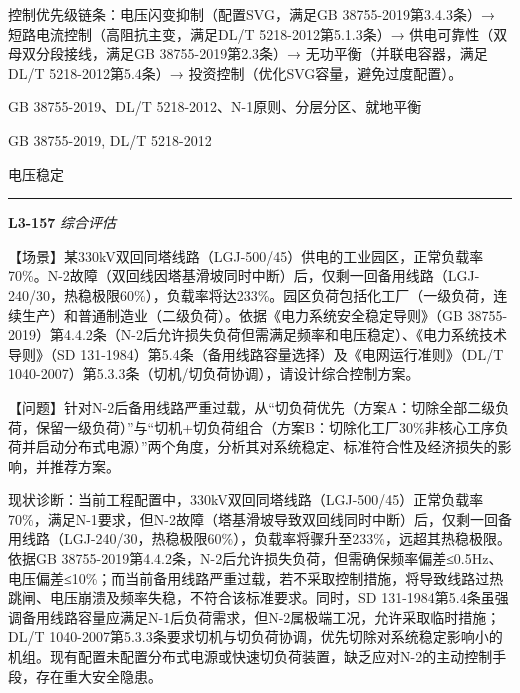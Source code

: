 \documentclass[12pt,a4paper]{ctexart}
\begin{document}
\begin{description}[leftmargin=1.5em,style=nextline,font=\normalfont]
控制优先级链条：电压闪变抑制（配置SVG，满足GB 38755-2019第3.4.3条）→ 短路电流控制（高阻抗主变，满足DL/T 5218-2012第5.1.3条）→ 供电可靠性（双母双分段接线，满足GB 38755-2019第2.3条）→ 无功平衡（并联电容器，满足DL/T 5218-2012第5.4条）→ 投资控制（优化SVG容量，避免过度配置）。
  \item[KW:] GB 38755-2019、DL/T 5218-2012、N-1原则、分层分区、就地平衡
  \item[Std:] GB 38755-2019, DL/T 5218-2012
  \item[Topic:] 电压稳定
\end{description}
\vspace{4pt}
\hrule\vspace{6pt}

\noindent\textbf{L3-157} \hfill \textit{综合评估}
\begin{description}[leftmargin=1.5em,style=nextline,font=\normalfont]
  \item[Q:] 【场景】某330kV双回同塔线路（LGJ-500/45）供电的工业园区，正常负载率70\%。N-2故障（双回线因塔基滑坡同时中断）后，仅剩一回备用线路（LGJ-240/30，热稳极限60\%），负载率将达233\%。园区负荷包括化工厂（一级负荷，连续生产）和普通制造业（二级负荷）。依据《电力系统安全稳定导则》（GB 38755-2019）第4.4.2条（N-2后允许损失负荷但需满足频率和电压稳定）、《电力系统技术导则》（SD 131-1984）第5.4条（备用线路容量选择）及《电网运行准则》（DL/T 1040-2007）第5.3.3条（切机/切负荷协调），请设计综合控制方案。

【问题】针对N-2后备用线路严重过载，从“切负荷优先（方案A：切除全部二级负荷，保留一级负荷）”与“切机+切负荷组合（方案B：切除化工厂30\%非核心工序负荷并启动分布式电源）”两个角度，分析其对系统稳定、标准符合性及经济损失的影响，并推荐方案。
  \item[A:] 现状诊断：当前工程配置中，330kV双回同塔线路（LGJ-500/45）正常负载率70\%，满足N-1要求，但N-2故障（塔基滑坡导致双回线同时中断）后，仅剩一回备用线路（LGJ-240/30，热稳极限60\%），负载率将骤升至233\%，远超其热稳极限。依据GB 38755-2019第4.4.2条，N-2后允许损失负荷，但需确保频率偏差≤0.5Hz、电压偏差≤10\%；而当前备用线路严重过载，若不采取控制措施，将导致线路过热跳闸、电压崩溃及频率失稳，不符合该标准要求。同时，SD 131-1984第5.4条虽强调备用线路容量应满足N-1后负荷需求，但N-2属极端工况，允许采取临时措施；DL/T 1040-2007第5.3.3条要求切机与切负荷协调，优先切除对系统稳定影响小的机组。现有配置未配置分布式电源或快速切负荷装置，缺乏应对N-2的主动控制手段，存在重大安全隐患。


\end{description}
\end{document}
